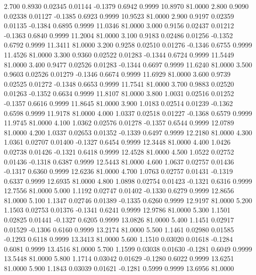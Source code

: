    2.700   0.8930   0.02345   0.01144  -0.1379   0.6942   0.9999  10.8970  81.0000
   2.800   0.9090   0.02338   0.01127  -0.1385   0.6923   0.9999  10.9523  81.0000
   2.900   0.9197   0.02359   0.01135  -0.1384   0.6895   0.9999  11.0346  81.0000
   3.000   0.9156   0.02437   0.01212  -0.1363   0.6840   0.9999  11.2004  81.0000
   3.100   0.9183   0.02486   0.01256  -0.1352   0.6792   0.9999  11.3411  81.0000
   3.200   0.9258   0.02510   0.01276  -0.1346   0.6755   0.9999  11.4526  81.0000
   3.300   0.9360   0.02522   0.01283  -0.1344   0.6724   0.9999  11.5449  81.0000
   3.400   0.9477   0.02526   0.01283  -0.1344   0.6697   0.9999  11.6240  81.0000
   3.500   0.9603   0.02526   0.01279  -0.1346   0.6674   0.9999  11.6929  81.0000
   3.600   0.9739   0.02525   0.01272  -0.1348   0.6653   0.9999  11.7541  81.0000
   3.700   0.9883   0.02520   0.01263  -0.1352   0.6634   0.9999  11.8107  81.0000
   3.800   1.0031   0.02516   0.01252  -0.1357   0.6616   0.9999  11.8645  81.0000
   3.900   1.0183   0.02514   0.01239  -0.1362   0.6598   0.9999  11.9178  81.0000
   4.000   1.0337   0.02518   0.01227  -0.1368   0.6579   0.9999  11.9745  81.0000
   4.100   1.0362   0.02576   0.01278  -0.1357   0.6544   0.9999  12.0789  81.0000
   4.200   1.0337   0.02653   0.01352  -0.1339   0.6497   0.9999  12.2180  81.0000
   4.300   1.0361   0.02707   0.01400  -0.1327   0.6454   0.9999  12.3448  81.0000
   4.400   1.0426   0.02738   0.01426  -0.1321   0.6418   0.9999  12.4528  81.0000
   4.500   1.0522   0.02752   0.01436  -0.1318   0.6387   0.9999  12.5443  81.0000
   4.600   1.0637   0.02757   0.01436  -0.1317   0.6360   0.9999  12.6236  81.0000
   4.700   1.0763   0.02757   0.01431  -0.1319   0.6337   0.9999  12.6935  81.0000
   4.800   1.0898   0.02754   0.01423  -0.1321   0.6316   0.9999  12.7556  81.0000
   5.000   1.1192   0.02747   0.01402  -0.1330   0.6279   0.9999  12.8656  81.0000
   5.100   1.1347   0.02746   0.01389  -0.1335   0.6260   0.9999  12.9197  81.0000
   5.200   1.1503   0.02753   0.01376  -0.1341   0.6241   0.9999  12.9786  81.0000
   5.300   1.1501   0.02825   0.01441  -0.1327   0.6205   0.9999  13.0826  81.0000
   5.400   1.1451   0.02917   0.01529  -0.1306   0.6160   0.9999  13.2174  81.0000
   5.500   1.1461   0.02980   0.01585  -0.1293   0.6118   0.9999  13.3413  81.0000
   5.600   1.1510   0.03020   0.01618  -0.1284   0.6081   0.9999  13.4516  81.0000
   5.700   1.1599   0.03038   0.01630  -0.1281   0.6049   0.9999  13.5448  81.0000
   5.800   1.1714   0.03042   0.01629  -0.1280   0.6022   0.9999  13.6251  81.0000
   5.900   1.1843   0.03039   0.01621  -0.1281   0.5999   0.9999  13.6956  81.0000
